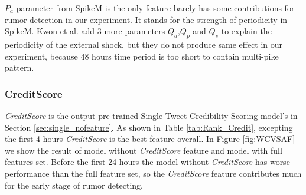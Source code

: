  $P_a$ parameter from SpikeM is the only feature barely has some contributions for rumor detection in our experiment. It stands for the strength of periodicity in SpikeM.  Kwon  et al. add 3 more parameters $Q_a$,$Q_p$ and $Q_s$ to explain the periodicity of the external shock, but they do not produce same effect in our experiment, because 48 hours time period is too short to contain multi-pike pattern.

\begin{table}[!h]
\centering
{}
 \caption{Rank of Part of SpikeM Features and Epidemiological Features}
\label{SPikemfeaturerank}

 \end{table}
 
 \subsubsection{CreditScore}
 \label{creditscore}
 
\emph{CreditScore} is the output pre-trained Single Tweet Credibility Scoring model's in Section \ref{sec:single_nofeature}. As shown in Table \ref{tab:Rank_Credit}, excepting the first 4 hours \emph{CreditScore} is the best feature overall. In Figure \ref{fig:WCVSAF} we show the result of model without \emph{CreditScore} feature and model with full features set. Before the first 24 hours the model without \emph{CreditScore} has worse performance than the full feature set, so the \emph{CreditScore} feature contributes much for the early stage of rumor detecting. 

